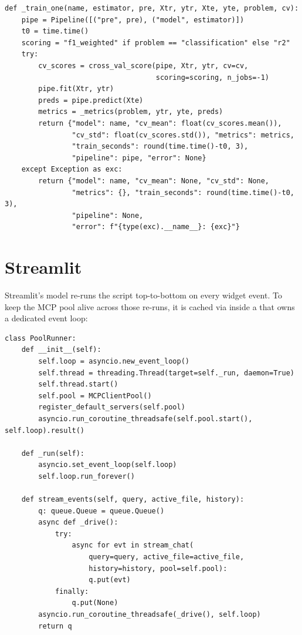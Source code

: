 \begin{lstlisting}[caption={\code{\_train\_one} worker (extract).},
label={lst:worker}]
def _train_one(name, estimator, pre, Xtr, ytr, Xte, yte, problem, cv):
    pipe = Pipeline([("pre", pre), ("model", estimator)])
    t0 = time.time()
    scoring = "f1_weighted" if problem == "classification" else "r2"
    try:
        cv_scores = cross_val_score(pipe, Xtr, ytr, cv=cv,
                                    scoring=scoring, n_jobs=-1)
        pipe.fit(Xtr, ytr)
        preds = pipe.predict(Xte)
        metrics = _metrics(problem, ytr, yte, preds)
        return {"model": name, "cv_mean": float(cv_scores.mean()),
                "cv_std": float(cv_scores.std()), "metrics": metrics,
                "train_seconds": round(time.time()-t0, 3),
                "pipeline": pipe, "error": None}
    except Exception as exc:
        return {"model": name, "cv_mean": None, "cv_std": None,
                "metrics": {}, "train_seconds": round(time.time()-t0, 3),
                "pipeline": None,
                "error": f"{type(exc).__name__}: {exc}"}
\end{lstlisting}

\section{Streamlit }
\label{sec:st-runner}

Streamlit's model re-runs the script top-to-bottom on every widget
event. To keep the MCP pool alive across those re-runs, it is cached
via  inside a  that owns a
dedicated event loop:

\begin{lstlisting}[caption={\code{PoolRunner} (extract).},
label={lst:runner}]
class PoolRunner:
    def __init__(self):
        self.loop = asyncio.new_event_loop()
        self.thread = threading.Thread(target=self._run, daemon=True)
        self.thread.start()
        self.pool = MCPClientPool()
        register_default_servers(self.pool)
        asyncio.run_coroutine_threadsafe(self.pool.start(), self.loop).result()

    def _run(self):
        asyncio.set_event_loop(self.loop)
        self.loop.run_forever()

    def stream_events(self, query, active_file, history):
        q: queue.Queue = queue.Queue()
        async def _drive():
            try:
                async for evt in stream_chat(
                    query=query, active_file=active_file,
                    history=history, pool=self.pool):
                    q.put(evt)
            finally:
                q.put(None)
        asyncio.run_coroutine_threadsafe(_drive(), self.loop)
        return q
\end{lstlisting}

